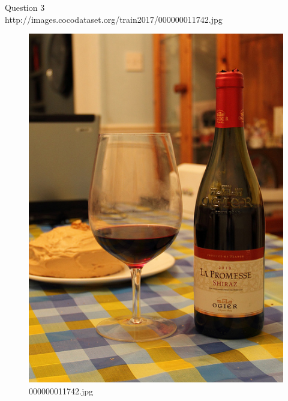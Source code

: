 Question 3\\
http://images.cocodataset.org/train2017/000000011742.jpg
    \begin{figure}[h]
        \centering
        \includegraphics[width=0.8\linewidth]{../image set/easy/000000011742.jpg}
        \caption{000000011742.jpg}
    \end{figure}
